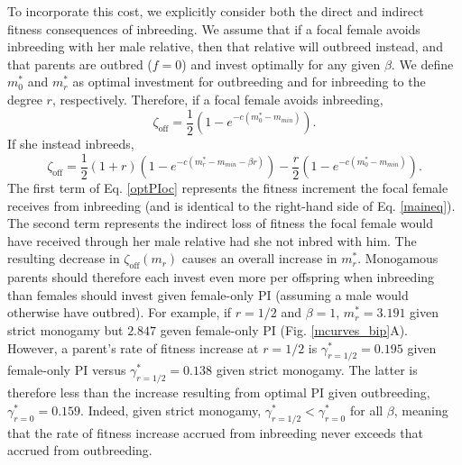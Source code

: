 \documentclass[12pt]{article}
\begin{document}
To incorporate this cost, we explicitly consider both the direct and indirect fitness consequences of inbreeding. We assume that if a focal female avoids inbreeding with her male relative, then that relative will outbreed instead, and that parents are outbred ($f=0$) and invest optimally for any given $\beta$. We define $m^{*}_{0}$ and $m^{*}_{r}$ as optimal investment for outbreeding and for inbreeding to the degree $r$, respectively. Therefore, if a focal female avoids inbreeding,
\begin{equation} \label{optPI}
\zeta_{\textrm{off}} = \frac{1}{2}\left(1-e^{-c\left(m^{*}_{0}-m_{min}\right)}\right).
\end{equation}
If she instead inbreeds,
\begin{equation} \label{optPIoc}
\zeta_{\textrm{off}} = \frac{1}{2}\left(1+r\right)\left(1-e^{-c\left(m^{*}_{r}-m_{min}-\beta r\right)}\right) - \frac{r}{2}\left(1-e^{-c\left(m^{*}_{0}-m_{min}\right)}\right).
\end{equation} 
The first term of Eq. \ref{optPIoc} represents the fitness increment the focal female receives from inbreeding (and is identical to the right-hand side of Eq. \ref{maineq}). The second term represents the indirect loss of fitness the focal female would have received through her male relative had she not inbred with him. The resulting decrease in $\zeta_{\textrm{off}}(m_{r})$ causes an overall increase in $m^{*}_{r}$. Monogamous parents should therefore each invest even more per offspring when inbreeding than females should invest given female-only PI (assuming a male would otherwise have outbred). For example, if $r=1/2$ and $\beta=1$, $m^{*}_{r}= 3.191$ given strict monogamy but $2.847$ geven female-only PI (Fig. \ref{mcurves_bip}A).  However, a parent's rate of fitness increase at $r=1/2$ is $\gamma^{*}_{r=1/2}=0.195$ given female-only PI versus $\gamma^{*}_{r=1/2}=0.138$ given strict monogamy. The latter is therefore less than the increase resulting from optimal PI given outbreeding, $\gamma^{*}_{r=0}=0.159$. Indeed, given strict monogamy, $\gamma^{*}_{r=1/2} < \gamma^{*}_{r=0}$ for all $\beta$, meaning that the rate of fitness increase accrued from inbreeding never exceeds that accrued from outbreeding. %
\end{document}
